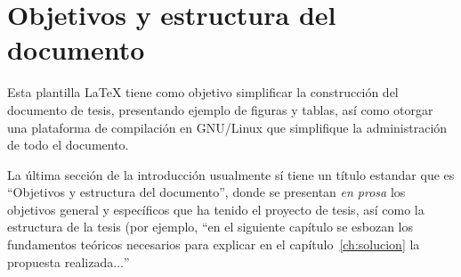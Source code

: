 \section{Objetivos y estructura del documento}

Esta plantilla LaTeX tiene como objetivo simplificar la construcción del
documento de tesis, presentando ejemplo de figuras y tablas, así como otorgar
una plataforma de compilación en GNU/Linux que simplifique la administración de
todo el documento.

La última sección de la introducción usualmente sí tiene un título estandar que
es ``Objetivos y estructura del documento'', donde se presentan \emph{en prosa}
los objetivos general y específicos que ha tenido el proyecto de tesis,
así como la estructura de la tesis (por ejemplo, ``en el siguiente capítulo se
esbozan los fundamentos teóricos necesarios para explicar en el
capítulo~\ref{ch:solucion} la propuesta realizada$\ldots$''

